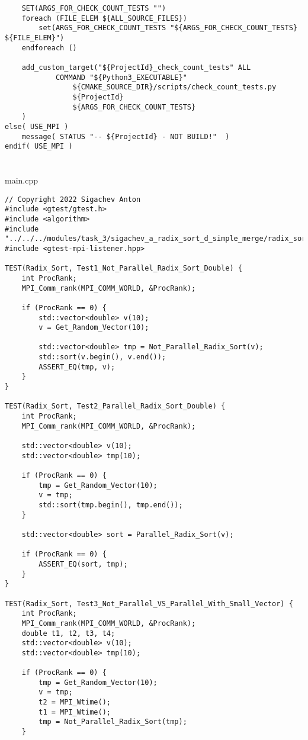 \documentclass[12pt,a4paper]{article}
\begin{document}
\begin{lstlisting}
    SET(ARGS_FOR_CHECK_COUNT_TESTS "")
    foreach (FILE_ELEM ${ALL_SOURCE_FILES})
        set(ARGS_FOR_CHECK_COUNT_TESTS "${ARGS_FOR_CHECK_COUNT_TESTS} ${FILE_ELEM}")
    endforeach ()

    add_custom_target("${ProjectId}_check_count_tests" ALL
            COMMAND "${Python3_EXECUTABLE}"
                ${CMAKE_SOURCE_DIR}/scripts/check_count_tests.py
                ${ProjectId}
                ${ARGS_FOR_CHECK_COUNT_TESTS}
    )
else( USE_MPI )
    message( STATUS "-- ${ProjectId} - NOT BUILD!"  )
endif( USE_MPI )
\end{lstlisting}

\section{}main.cpp
\begin{lstlisting}
// Copyright 2022 Sigachev Anton
#include <gtest/gtest.h>
#include <algorithm>
#include "../../../modules/task_3/sigachev_a_radix_sort_d_simple_merge/radix_sort_d_simple_merge.h"
#include <gtest-mpi-listener.hpp>

TEST(Radix_Sort, Test1_Not_Parallel_Radix_Sort_Double) {
    int ProcRank;
    MPI_Comm_rank(MPI_COMM_WORLD, &ProcRank);

    if (ProcRank == 0) {
        std::vector<double> v(10);
        v = Get_Random_Vector(10);

        std::vector<double> tmp = Not_Parallel_Radix_Sort(v);
        std::sort(v.begin(), v.end());
        ASSERT_EQ(tmp, v);
    }
}

TEST(Radix_Sort, Test2_Parallel_Radix_Sort_Double) {
    int ProcRank;
    MPI_Comm_rank(MPI_COMM_WORLD, &ProcRank);

    std::vector<double> v(10);
    std::vector<double> tmp(10);

    if (ProcRank == 0) {
        tmp = Get_Random_Vector(10);
        v = tmp;
        std::sort(tmp.begin(), tmp.end());
    }

    std::vector<double> sort = Parallel_Radix_Sort(v);

    if (ProcRank == 0) {
        ASSERT_EQ(sort, tmp);
    }
}

TEST(Radix_Sort, Test3_Not_Parallel_VS_Parallel_With_Small_Vector) {
    int ProcRank;
    MPI_Comm_rank(MPI_COMM_WORLD, &ProcRank);
    double t1, t2, t3, t4;
    std::vector<double> v(10);
    std::vector<double> tmp(10);

    if (ProcRank == 0) {
        tmp = Get_Random_Vector(10);
        v = tmp;
        t2 = MPI_Wtime();
        t1 = MPI_Wtime();
        tmp = Not_Parallel_Radix_Sort(tmp);
    }


\end{lstlisting}
\end{document}
